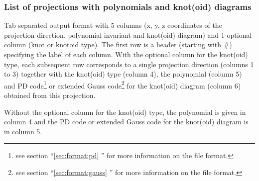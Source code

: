 \subsubsection{\label{sec:format:multiprojection:diagrams}List of projections with polynomials and knot(oid) diagrams}
Tab separated output format with 5 columns (x, y, z coordinates of the projection direction, polynomial invariant and knot(oid) diagram) and  1 optional column (knot or knotoid type).
The first row is a header (starting with \#) specifying the label of each column.
With the optional column for the knot(oid) type, each subsequent row corresponds to a single projection direction (columns 1 to 3) together with the knot(oid) type (column 4), the polynomial (column 5) and PD code\footnote{see section ``\ref{sec:format:pd} '' for more information on the file format.} or extended Gauss code\footnote{see section ``\ref{sec:format:gauss} '' for more information on the file format.} for the knot(oid) diagram (column 6) obtained from this projection.

Without the optional column for the knot(oid) type, the polynomial is given in column 4 and the PD code or extended Gauss code for the knot(oid) diagram is in column 5.


